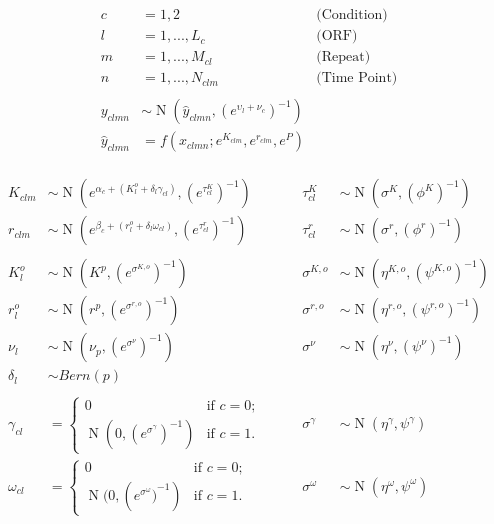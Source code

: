 \documentclass[11pt,a4paper]{article}
\begin{document}
\begin{align*}
c&=1,2 \qquad & \text{(Condition)}\\
l&=1,...,L_{c}  \qquad & \text{(ORF)}\\
m&=1,...,M_{cl}      \qquad & \text{(Repeat)}\\
n&=1,...,N_{clm}     \qquad & \text{(Time Point)}\\
\\
y_{clmn} &\sim \operatorname{N}(\hat{y}_{clmn},(e^{ \upsilon_{l}+\nu_{c}  })^{-1} ) \\
\hat{y}_{clmn} &= f(x_{clmn};e^{ K_{clm} } ,e^{ r_{clm} } , e^{ P })\\
\end{align*}

\begin{align*}
K_{clm} &\sim \operatorname{N}(e^{\alpha_{c}+(K_{l}^o+\delta_{l}\gamma_{cl})},(e^{ \tau_{cl}^K })^{-1})\qquad &\tau_{cl}^K &\sim \operatorname{N}(\sigma^{K}, (\phi^{K})^{-1} )\\
r_{clm} &\sim \operatorname{N}(e^{\beta_{c}+(r_{l}^o+\delta_{l}\omega_{cl})},(e^{ \tau_{cl}^r })^{-1})\qquad &\tau_{cl}^r &\sim \operatorname{N}(\sigma^{r}, (\phi^{r})^{-1} )\\
\\
K_{l}^o &\sim \operatorname{N}(K^p, (e^{ \sigma^{K,o} })^{-1} )\qquad &\sigma^{K,o} &\sim \operatorname{N}(\eta^{K,o}, (\psi^{K,o})^{-1} )\\
r_{l}^o &\sim \operatorname{N}(r^p, (e^{ \sigma^{r,o} })^{-1} )\qquad &\sigma^{r,o} &\sim \operatorname{N}(\eta^{r,o}, (\psi^{r,o})^{-1} )\\
\nu_{l} &\sim \operatorname{N}(\nu_{p},(e^{ \sigma^{\nu} })^{-1})\qquad&\sigma^{\nu} &\sim \operatorname{N}(\eta^{\nu}, (\psi^{\nu})^{-1} )\\
\delta_{l} &\sim Bern(p)\\
\\
\gamma_{cl}&= \begin{cases}
0  & \text{if } c=0;\\
\operatorname{N}(0,{(e^{\sigma^{\gamma}})}^{-1}) & \text{if } c=1.
\end{cases}
\qquad
&\sigma^{\gamma}&\sim \operatorname{N}(\eta^{\gamma},\psi^{\gamma})
\\
\omega_{cl}&= \begin{cases}
0  & \text{if } c=0;\\
\operatorname{N}(0,({e^{\sigma^{\omega}})}^{-1}) & \text{if } c=1.
\end{cases}
\qquad
&\sigma^{\omega}&\sim \operatorname{N}(\eta^{\omega},\psi^{\omega})
\end{align*}
\end{document}
